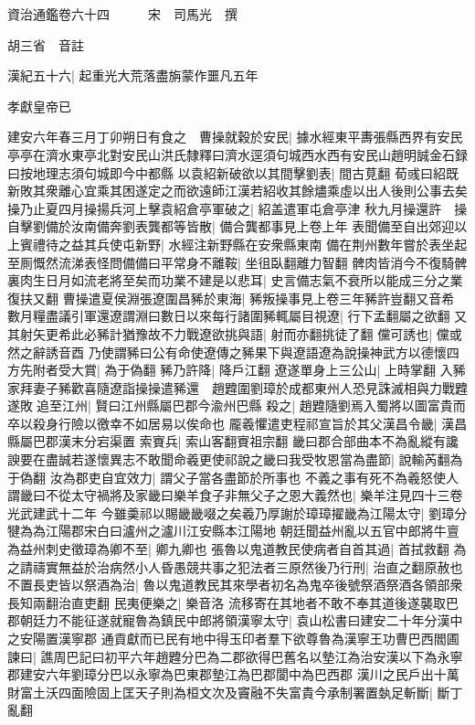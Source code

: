 資治通鑑卷六十四　　　宋　司馬光　撰

胡三省　音註

漢紀五十六|{
	起重光大荒落盡旃蒙作噩凡五年}


孝獻皇帝已

建安六年春三月丁卯朔日有食之　曹操就穀於安民|{
	據水經東平夀張縣西界有安民亭亭在濟水東亭北對安民山洪氏隸釋曰濟水逕須句城西水西有安民山趙明誠金石録曰按地理志須句城即今中都縣}
以袁紹新破欲以其間擊劉表|{
	間古莧翻}
荀彧曰紹既新敗其衆離心宜乘其困遂定之而欲遠師江漢若紹收其餘燼乘虛以出人後則公事去矣操乃止夏四月操揚兵河上擊袁紹倉亭軍破之|{
	紹盖遣軍屯倉亭津}
秋九月操還許　操自擊劉備於汝南備奔劉表龔都等皆散|{
	備合龔都事見上卷上年}
表聞備至自出郊迎以上賓禮待之益其兵使屯新野|{
	水經注新野縣在安衆縣東南}
備在荆州數年嘗於表坐起至厠慨然流涕表怪問備備曰平常身不離鞍|{
	坐徂臥翻離力智翻}
髀肉皆消今不復騎髀裏肉生日月如流老將至矣而功業不建是以悲耳|{
	史言備志氣不衰所以能成三分之業復扶又翻}
曹操遣夏侯淵張遼圍昌豨於東海|{
	豨叛操事見上卷三年豨許豈翻又音希}
數月糧盡議引軍還遼謂淵曰數日以來每行諸圍豨輒屬目視遼|{
	行下孟翻屬之欲翻}
又其射矢更希此必豨計猶豫故不力戰遼欲挑與語|{
	射而亦翻挑徒了翻}
儻可誘也|{
	儻或然之辭誘音酉}
乃使謂豨曰公有命使遼傳之豨果下與遼語遼為說操神武方以德懷四方先附者受大賞|{
	為于偽翻}
豨乃許降|{
	降戶江翻}
遼遂單身上三公山|{
	上時掌翻}
入豨家拜妻子豨歡喜隨遼詣操操遣豨還　趙韙圍劉璋於成都東州人恐見誅滅相與力戰韙遂敗追至江州|{
	賢曰江州縣屬巴郡今渝州巴縣}
殺之|{
	趙韙隨劉焉入蜀將以圖富貴而卒以殺身行險以徼幸不如居易以俟命也}
龎羲懼遣吏程祁宣旨於其父漢昌令畿|{
	漢昌縣屬巴郡漢末分宕渠置}
索賨兵|{
	索山客翻賨祖宗翻}
畿曰郡合部曲本不為亂縱有讒諛要在盡誠若遂懷異志不敢聞命羲更使祁說之畿曰我受牧恩當為盡節|{
	說輸芮翻為于偽翻}
汝為郡吏自宜效力|{
	謂父子當各盡節於所事也}
不義之事有死不為羲怒使人謂畿曰不從太守禍將及家畿曰樂羊食子非無父子之恩大義然也|{
	樂羊注見四十三卷光武建武十二年}
今雖羮祁以賜畿畿啜之矣羲乃厚謝於璋璋擢畿為江陽太守|{
	劉璋分犍為為江陽郡宋白曰瀘州之瀘川江安縣本江陽地}
朝廷聞益州亂以五官中郎將牛亶為益州刺史徵璋為卿不至|{
	卿九卿也}
張魯以鬼道教民使病者自首其過|{
	首拭救翻}
為之請禱實無益於治病然小人昏愚競共事之犯法者三原然後乃行刑|{
	治直之翻原赦也}
不置長吏皆以祭酒為治|{
	魯以鬼道教民其來學者初名為鬼卒後號祭酒祭酒各領部衆長知兩翻治直吏翻}
民夷便樂之|{
	樂音洛}
流移寄在其地者不敢不奉其道後遂襲取巴郡朝廷力不能征遂就寵魯為鎮民中郎將領漢寧太守|{
	袁山松書曰建安二十年分漢中之安陽置漢寧郡}
通貢獻而已民有地中得玉印者羣下欲尊魯為漢寧王功曹巴西閻圃諫曰|{
	譙周巴記曰初平六年趙韙分巴為二郡欲得巴舊名以墊江為治安漢以下為永寧郡建安六年劉璋分巴以永寧為巴東郡墊江為巴郡閬中為巴西郡}
漢川之民戶出十萬財富土沃四面險固上匡天子則為桓文次及竇融不失富貴今承制署置埶足斬斷|{
	斷丁亂翻}
